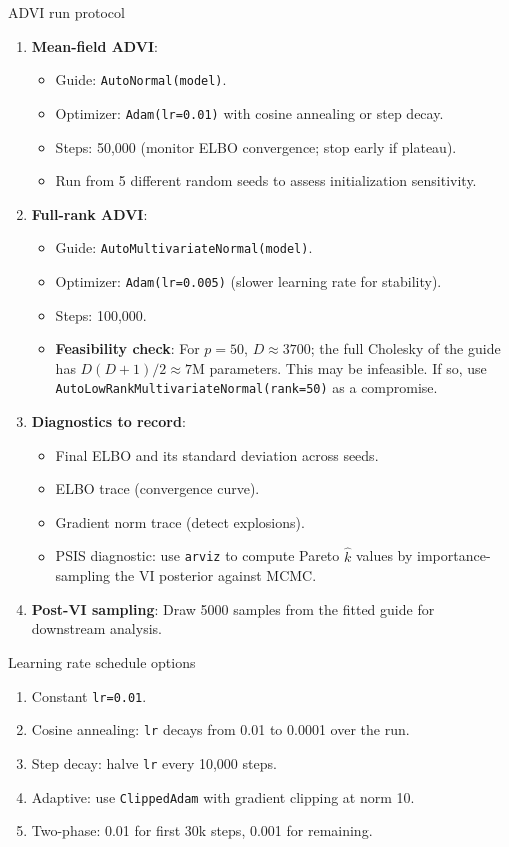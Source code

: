 \documentclass[11pt,a4paper]{article}
\begin{document}
\begin{action}{ADVI run protocol}
\begin{enumerate}
  \item \textbf{Mean-field ADVI}:
  \begin{itemize}[nosep]
    \item Guide: \texttt{AutoNormal(model)}.
    \item Optimizer: \texttt{Adam(lr=0.01)} with cosine annealing or step decay.
    \item Steps: 50,000 (monitor ELBO convergence; stop early if plateau).
    \item Run from 5 different random seeds to assess initialization sensitivity.
  \end{itemize}
  \item \textbf{Full-rank ADVI}:
  \begin{itemize}[nosep]
    \item Guide: \texttt{AutoMultivariateNormal(model)}.
    \item Optimizer: \texttt{Adam(lr=0.005)} (slower learning rate for stability).
    \item Steps: 100,000.
    \item \textbf{Feasibility check}: For $p=50$, $D \approx 3700$; the full Cholesky of the guide has $D(D+1)/2 \approx 7$M parameters. This may be infeasible. If so, use \texttt{AutoLowRankMultivariateNormal(rank=50)} as a compromise.
  \end{itemize}
  \item \textbf{Diagnostics to record}:
  \begin{itemize}[nosep]
    \item Final ELBO and its standard deviation across seeds.
    \item ELBO trace (convergence curve).
    \item Gradient norm trace (detect explosions).
    \item PSIS diagnostic: use \texttt{arviz} to compute Pareto $\hat{k}$ values by importance-sampling the VI posterior against MCMC.
  \end{itemize}
  \item \textbf{Post-VI sampling}: Draw 5000 samples from the fitted guide for downstream analysis.
\end{enumerate}
\end{action}

\begin{decision}{Learning rate schedule options}
\begin{enumerate}[nosep]
  \item[(a)] Constant \texttt{lr=0.01}.
  \item[(b)] Cosine annealing: \texttt{lr} decays from 0.01 to 0.0001 over the run.
  \item[(c)] Step decay: halve \texttt{lr} every 10,000 steps.
  \item[(d)] Adaptive: use \texttt{ClippedAdam} with gradient clipping at norm 10.
  \item[(e)] Two-phase: 0.01 for first 30k steps, 0.001 for remaining.
\end{enumerate}
\end{decision}
\end{document}
